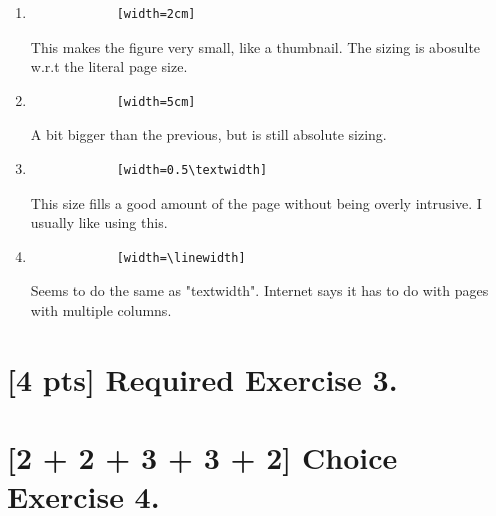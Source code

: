 \documentclass{article}
\begin{document}
\begin{enumerate}
    \item {
        \begin{verbatim}
            [width=2cm]
        \end{verbatim}

        This makes the figure very small, like a thumbnail. The
        sizing is abosulte w.r.t the literal page size.
    }
    \item {
        \begin{verbatim}
            [width=5cm]
        \end{verbatim}
        
        A bit bigger than the previous, but is still absolute sizing.
    }
    \item {
        \begin{verbatim}
            [width=0.5\textwidth]
        \end{verbatim}

        This size fills a good amount of the page without being overly 
        intrusive. I usually like using this.
    }

    \item {
        \begin{verbatim}
            [width=\linewidth]
        \end{verbatim}

        Seems to do the same as "textwidth". Internet says it has to do with 
        pages with multiple columns.
    }
\end{enumerate}

\section*{[4 pts] Required Exercise 3.}

\section*{[2 + 2 + 3 + 3 + 2] Choice Exercise 4.}
\end{document}
